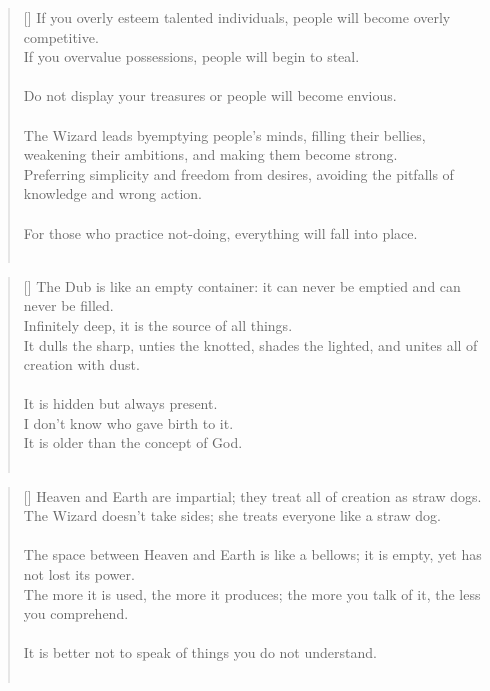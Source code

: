\documentclass{article}
\begin{document}
\settowidth{\versewidth}{The Wizard leads byemptying people’s minds, filling their bellies, weakening their am- bitions, and making them become strong}
\begin{verse}[\versewidth]
If you overly esteem talented individuals, people will become overly competitive.\\
If you overvalue possessions, people will begin to steal.\\
\hfill\\
Do not display your treasures or people will become envious.\\
\hfill\\
The Wizard leads byemptying people's minds, filling their bellies, weakening their ambitions, and making them become strong.\\
Preferring simplicity and freedom from desires, avoiding the pitfalls of knowledge and wrong action.\\
\hfill\\
For those who practice not-doing, everything will fall into place.\\
\hfill\\
\end{verse}

\settowidth{\versewidth}{The Wizard leads byemptying people’s minds, filling their bellies, weakening their am- bitions, and making them become strong}
\begin{verse}[\versewidth]
The Dub is like an empty container:
it can never be emptied and can never be filled.\\
Infinitely deep, it is the source of all things.\\
It dulls the sharp, unties the knotted, shades the lighted, and unites all of creation with dust.\\
\hfill\\
It is hidden but always present.\\
I don't know who gave birth to it.\\
It is older than the concept of God.\\
\hfill\\
\end{verse}

\settowidth{\versewidth}{The Wizard leads byemptying people’s minds, filling their bellies, weakening their am- bitions, and making them become strong}
\begin{verse}[\versewidth]
Heaven and Earth are impartial; they treat all of creation as straw dogs. 
The Wizard doesn't take sides; she treats everyone like a straw dog.\\
\hfill\\
The space between Heaven and Earth is like a bellows; it is empty, yet has not lost its power.\\
The more it is used, the more it produces; the more you talk of it, the less you comprehend.\\
\hfill\\
It is better not to speak of things you do not understand.\\
\hfill\\
\end{verse}
\end{document}

